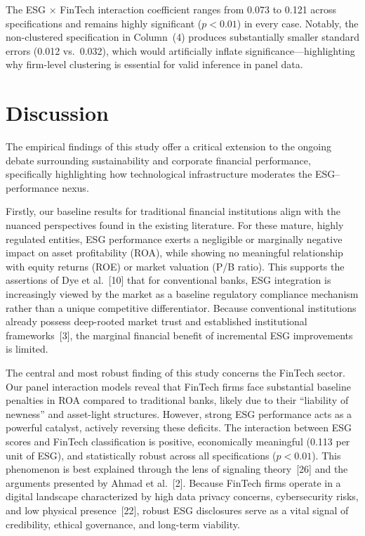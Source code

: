 \documentclass[12pt]{article}
\begin{document}
The ESG $\times$ FinTech interaction coefficient ranges from 0.073 to 0.121 across specifications and remains highly significant ($p < 0.01$) in every case. Notably, the non-clustered specification in Column~(4) produces substantially smaller standard errors (0.012 vs.\ 0.032), which would artificially inflate significance---highlighting why firm-level clustering is essential for valid inference in panel data.

\section{Discussion}\label{sec:discussion}
The empirical findings of this study offer a critical extension to the ongoing debate surrounding sustainability and corporate financial performance, specifically highlighting how technological infrastructure moderates the ESG--performance nexus.

Firstly, our baseline results for traditional financial institutions align with the nuanced perspectives found in the existing literature. For these mature, highly regulated entities, ESG performance exerts a negligible or marginally negative impact on asset profitability (ROA), while showing no meaningful relationship with equity returns (ROE) or market valuation (P/B ratio). This supports the assertions of Dye et al.~[10] that for conventional banks, ESG integration is increasingly viewed by the market as a baseline regulatory compliance mechanism rather than a unique competitive differentiator. Because conventional institutions already possess deep-rooted market trust and established institutional frameworks~[3], the marginal financial benefit of incremental ESG improvements is limited.

The central and most robust finding of this study concerns the FinTech sector. Our panel interaction models reveal that FinTech firms face substantial baseline penalties in ROA compared to traditional banks, likely due to their ``liability of newness'' and asset-light structures. However, strong ESG performance acts as a powerful catalyst, actively reversing these deficits. The interaction between ESG scores and FinTech classification is positive, economically meaningful (0.113 per unit of ESG), and statistically robust across all specifications ($p < 0.01$). This phenomenon is best explained through the lens of signaling theory~[26] and the arguments presented by Ahmad et al.~[2]. Because FinTech firms operate in a digital landscape characterized by high data privacy concerns, cybersecurity risks, and low physical presence~[22], robust ESG disclosures serve as a vital signal of credibility, ethical governance, and long-term viability.
\end{document}
